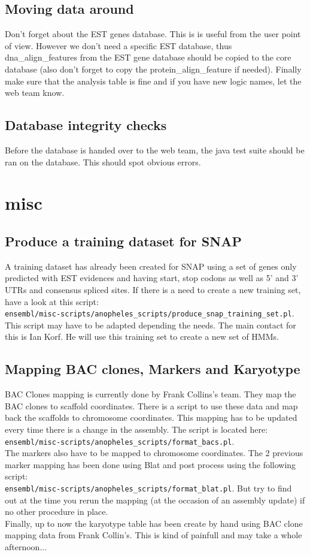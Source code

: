 \documentclass[a4paper,10pt]{article}
\begin{document}
\subsection{Moving data around}
Don't forget about the EST genes database. This is is useful from the user point of view. However we don't need a specific EST database, thus dna\_align\_features from the EST gene database should be copied to the core database (also don't forget to copy the protein\_align\_feature if needed). Finally make sure that the analysis table is fine and if you have new logic names, let the web team know.

\subsection{Database integrity checks}
Before the database is handed over to the web team, the java test suite should be ran on the database. This should spot obvious errors.

\section{misc}
\subsection{Produce a training dataset for SNAP}
A training dataset has already been created for SNAP using a set of genes only predicted with EST evidences and having start, stop codons as well as 5' and 3' UTRs and consensus spliced sites. If there is a need to create a new training set, have a look at this script:\\
 \texttt{ensembl/misc-scripts/anopheles\_scripts/produce\_snap\_training\_set.pl}. This script may have to be adapted depending the needs.
The main contact for this is Ian Korf. He will use this training set to create a new set of HMMs.

\subsection{Mapping BAC clones, Markers and Karyotype}
BAC Clones mapping is currently done by Frank Collins's team. They map the BAC clones to scaffold coordinates. There is a script to use these data and map back the scaffolds to chromosome coordinates. This mapping has to be updated every time there is a change in the assembly. The script is located here:\\
 \texttt{ensembl/misc-scripts/anopheles\_scripts/format\_bacs.pl}.\\
The markers also have to be mapped to chromosome coordinates. The 2 previous marker mapping has been done using Blat and post process using the following script: \\
\texttt{ensembl/misc-scripts/anopheles\_scripts/format\_blat.pl}. But try to find out at the time you rerun the mapping (at the occasion of an assembly update) if no other procedure in place.\\
Finally, up to now the karyotype table has been create by hand using BAC clone mapping data from Frank Collin's. This is kind of painfull and may take a whole afternoon...
\end{document}

